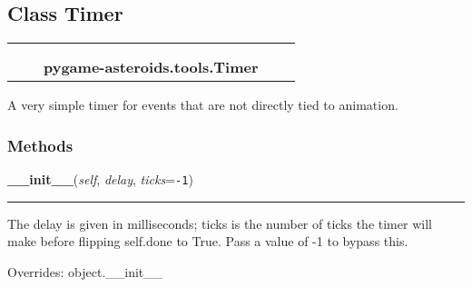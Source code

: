 

\subsection{Class Timer}

    \label{pygame-asteroids:tools:Timer}
\begin{tabular}{cccccc}
\multicolumn{2}{r}{\settowidth{\BCL}{object}\multirow{2}{\BCL}{object}}
&&
  \\\cline{3-3}
  &&\multicolumn{1}{c|}{}
&&
  \\
&&\multicolumn{2}{l}{\textbf{pygame-asteroids.tools.Timer}}
\end{tabular}

A very simple timer for events that are not directly tied to animation.



  \subsubsection{Methods}

    \vspace{0.5ex}

\hspace{.8\funcindent}\begin{boxedminipage}{\funcwidth}

    \raggedright \textbf{\_\_init\_\_}(\textit{self}, \textit{delay}, \textit{ticks}={\tt -1})

    \vspace{-1.5ex}

    \rule{\textwidth}{0.5\fboxrule}
\setlength{\parskip}{2ex}
    The delay is given in milliseconds; ticks is the number of ticks the 
    timer will make before flipping self.done to True.  Pass a value of -1 
    to bypass this.

\setlength{\parskip}{1ex}
      Overrides: object.\_\_init\_\_

    \end{boxedminipage}

